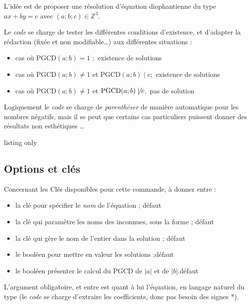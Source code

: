 \begin{tipblock}
L'idée est de proposer une résolution d'équation diophantienne du type $ax+by=c$ avec $(a;b;c) \in \mathbb{Z}^3$.

\smallskip

Le \textit{code} se charge de tester les différentes conditions d'existence, et d'adapter la rédaction (fixée et non modifiable\ldots) aux différentes situations :

\begin{itemize}
\item cas où $\text{PGCD}(a;b)=1$ ;\hfill~existence de solutions
\item cas où $\text{PGCD}(a;b) \neq 1$ et $\text{PGCD}(a;b) \mid c$;\hfill~existence de solutions
\item cas où $\text{PGCD}(a;b) \neq 1$ et $\text{PGCD}(a;b) \not\mid c$.\hfill~pas de solution
\end{itemize}
\vspace*{-\baselineskip}\leavevmode
\end{tipblock}

\begin{warningblock}
Logiquement le \textit{code} se charge de \textit{parenthéser} de manière automatique pour les nombres négatifs, mais il se peut que certains cas particuliers puissent donner des résultats \og non esthétiques \fg{}\ldots
\end{warningblock}

\begin{PresCodeTexPL}{listing only}
\end{PresCodeTexPL}

\subsection{Options et clés}

\begin{cautionblock}
Concernant les Clés disponibles pour cette commande, à donner entre \ctex{[...]} :

\begin{itemize}
\item la clé  pour spécifier le \textit{nom} de l'équation ; \hfill{}défaut 
\item la clé  qui paramètre les noms des inconnues, sous la forme  ; \hfill{}défaut 
\item la clé  qui gère le nom de l'entier dans la solution ; \hfill{}défaut 
\item le booléen  pour mettre en valeur les solutions ;\hfill{}défaut 
\item le booléen  présenter le calcul du PGCD de $|a|$ et de $|b|$.\hfill{}défaut 
\end{itemize}

L'argument obligatoire, et entre  est quant à lui l'équation, en langage \og naturel \fg{} du type  (le \textit{code} se charge d'extraire les coefficients, donc pas besoin des signes *).
\end{cautionblock}

